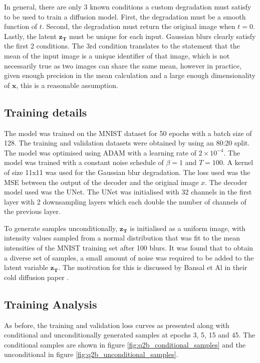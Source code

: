\documentclass[11pt]{article}
\begin{document}
In general, there are only 3 known conditions a custom degradation must satisfy to be used to train a diffusion model.
First, the degradation must be a smooth function of $t$. Second, the degradation must return the original image when $t=0$. Lastly, the latent $\mathbf{z_T}$ must be unique for each input. Gaussian blurs clearly satisfy the first 2 conditions. The 3rd condition translates to the statement that the mean of the input image is a unique identifier of that image, which is not necessarily true as two images can share the same mean, however in practice, given enough precision in the mean calculation and a large enough dimensionality of $\mathbf{x}$, this is a reasonable assumption.

\subsection{Training details}
The model was trained on the MNIST dataset for 50 epochs with a batch size of 128. The training and validation datasets were obtained by using an 80:20 split. The model was optimised using ADAM with a learning rate of $2 \times 10^{-4}$. The model was trained with a constant noise schedule of $\beta = 1$ and $T=100$. A kernel of size 11x11 was used for the Gaussian blur degradation. The loss used was the MSE between the output of the decoder and the original image $x$. The decoder model used was the UNet. The UNet was initialised with 32 channels in the first layer with 2 downsampling layers which each double the number of channels of the previous layer.

To generate samples unconditionally, $\mathbf{z_T}$ is initialised as a uniform image, with intensity values sampled from a normal distribution that was fit to the mean intensities of the MNIST training set after 100 blurs. It was found that to obtain a diverse set of samples, a small amount of noise was required to be added to the latent variable $\mathbf{z_T}$. The motivation for this is discussed by Bansal et Al in their cold diffusion paper \cite{bansal2022cold}.
\subsection{Training Analysis}
As before, the training and validation loss curves as presented along with conditional and unconditionally generated samples at epochs 3, 5, 15 and 45. The conditional samples are shown in figure \ref{fig:q2b_conditional_samples} and the unconditional in figure
\ref{fig:q2b_unconditional_samples}.
\end{document}
